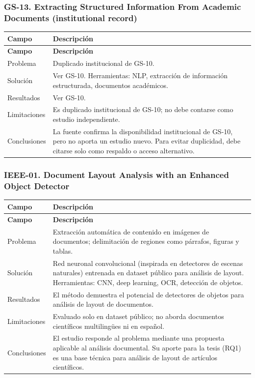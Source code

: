 \subsubsection*{GS-13. Extracting Structured Information From Academic Documents (institutional record)}

\begin{longtable}{@{}>{\raggedright\arraybackslash}p{}>{\raggedright\arraybackslash}p{}@{}}
\toprule
\textbf{Campo} & \textbf{Descripción} \\
\midrule
\endfirsthead
\toprule
\textbf{Campo} & \textbf{Descripción} \\
\midrule
\endhead
\bottomrule
\endfoot
\endlastfoot
Problema & Duplicado institucional de GS-10. \\
Solución & Ver GS-10. Herramientas: NLP, extracción de información estructurada, documentos académicos. \\
Resultados & Ver GS-10. \\
Limitaciones & Es duplicado institucional de GS-10; no debe contarse como estudio independiente. \\
Conclusiones & La fuente confirma la disponibilidad institucional de GS-10, pero no aporta un estudio nuevo. Para evitar duplicidad, debe citarse solo como respaldo o acceso alternativo. \\
\end{longtable}

\subsubsection*{IEEE-01. Document Layout Analysis with an Enhanced Object Detector}

\begin{longtable}{@{}>{\raggedright\arraybackslash}p{}>{\raggedright\arraybackslash}p{}@{}}
\toprule
\textbf{Campo} & \textbf{Descripción} \\
\midrule
\endfirsthead
\toprule
\textbf{Campo} & \textbf{Descripción} \\
\midrule
\endhead
\bottomrule
\endfoot
\endlastfoot
Problema & Extracción automática de contenido en imágenes de documentos; delimitación de regiones como párrafos, figuras y tablas. \\
Solución & Red neuronal convolucional (inspirada en detectores de escenas naturales) entrenada en dataset público para análisis de layout. Herramientas: CNN, deep learning, OCR, detección de objetos. \\
Resultados & El método demuestra el potencial de detectores de objetos para análisis de layout de documentos. \\
Limitaciones & Evaluado solo en dataset público; no aborda documentos científicos multilingües ni en español. \\
Conclusiones & El estudio responde al problema mediante una propuesta aplicable al análisis documental. Su aporte para la tesis (RQ1) es una base técnica para análisis de layout de artículos científicos. \\
\end{longtable}

